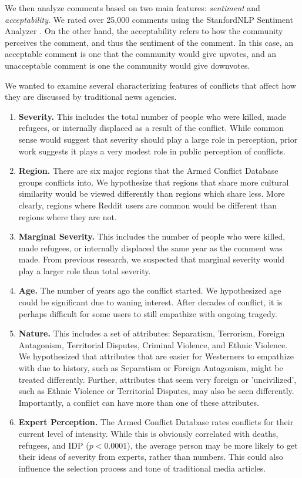 We then analyze comments based on two main features: \textit{sentiment} and \textit{acceptability}. We rated over 25,000 comments using the StanfordNLP Sentiment Analyzer \cite{stanfordnlp}. On the other hand, the acceptability refers to how the community perceives the comment, and thus the sentiment of the comment. In this case, an acceptable comment is one that the community would give upvotes, and an unacceptable comment is one the community would give downvotes.

We wanted to examine several characterizing features of conflicts that affect how they are discussed by traditional news agencies.

\begin{enumerate}
\item{\textbf{Severity.} This includes the total number of people who were killed, made refugees, or internally displaced as a result of the conflict. While common sense would suggest that severity should play a large role in perception, prior work suggests it plays a very modest role in public perception of conflicts.} 
\item {\textbf{Region.} There are six major regions that the Armed Conflict Database groups conflicts into. We hypothesize that regions that share more cultural similarity would be viewed differently than regions which share less. More clearly, regions where Reddit users are common would be different than regions where they are not.} 
\item {\textbf{Marginal Severity.} This includes the number of people who were killed, made refugees, or internally displaced the same year as the comment was made. From previous research, we suspected that marginal severity would play a larger role than total severity.}
\item {\textbf{Age.} The number of years ago the conflict started. We hypothesized age could be significant due to waning interest. After decades of conflict, it is perhaps difficult for some users to still empathize with ongoing tragedy.}
\item {\textbf{Nature.} This includes a set of attributes: Separatism, Terrorism, Foreign Antagonism, Territorial Disputes, Criminal Violence, and Ethnic Violence. We hypothesized that attributes that are easier for Westerners to empathize with due to history, such as Separatism or Foreign Antagonism, might be treated differently. Further, attributes that seem very foreign or 'uncivilized', such as Ethnic Violence or Territorial Disputes, may also be seen differently. Importantly, a conflict can have more than one of these attributes.}
\item {\textbf{Expert Perception.} The Armed Conflict Database rates conflicts for their current level of intensity. While this is obviously correlated with deaths, refugees, and IDP ($p < 0.0001$), the average person may be more likely to get their ideas of severity from experts, rather than numbers. This could also influence the selection process and tone of traditional media articles.} 
\end{enumerate}